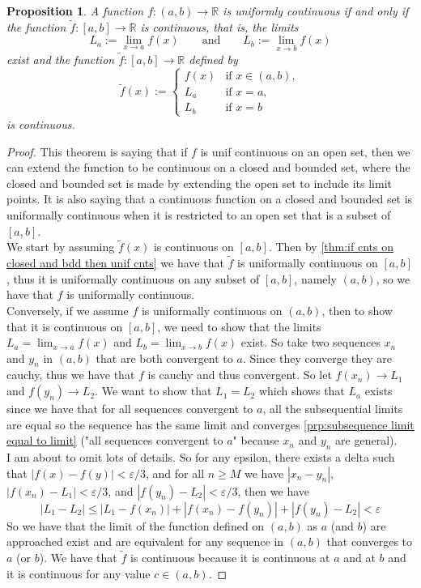 \documentclass{article}
\newtheorem{proposition}{Proposition}[section]
\theoremstyle{definition}
\theoremstyle{remark}
\begin{document}
\vspace{.5cm}


\begin{proposition}
A function $f : (a, b) \to \mathbb{R}$ is uniformly continuous if and only if the function $\tilde{f}: [a,b] \to \mathbb{R}$ is continuous, that is, the limits
\[
L_a := \lim_{x \to a} f(x) \qquad \text{and} \qquad L_b := \lim_{x \to b} f(x)
\]
exist and the function $\tilde{f} : [a, b] \to \mathbb{R}$ defined by
\[
\tilde{f}(x) := 
\begin{cases}
f(x) & \text{if } x \in (a, b), \\
L_a & \text{if } x = a, \\
L_b & \text{if } x = b
\end{cases}
\]
is continuous.
\end{proposition}

\begin{proof}
This theorem is saying that if $f$ is unif continuous on an open set, then we can extend 
the function to be continuous on a closed and bounded set, where the closed and bounded set is made by extending the open set to include its limit points. 
It is also saying that a continuous function on a closed and bounded set is
uniformally continuous when it is restricted to an open set that is a subset of $[a,b]$.\\
We start by assuming $\tilde{f}(x)$ is continuous on $[a,b]$. Then by \ref{thm:if cnts on closed and bdd then unif cnts} we have that $\tilde{f}$ 
is uniformally continuous on $[a,b]$, thus it is uniformally continuous on any subset of $[a,b]$, namely 
$(a,b)$, so we have that $f$ is uniformally continuous. \\
Conversely, if we assume $f$ is uniformally continuous on $(a,b)$, then to show that 
it is continuous on $[a,b]$, we need to show that the limits $L_a = \lim_{x \to a}{f(x)}$ and $L_b = \lim_{x \to b}{f(x)}$ exist. 
So take two sequences $x_n$ and $y_n$ in $(a,b)$ that are both convergent to $a$. Since they converge they are cauchy, 
thus we have that $f$ is cauchy and thus convergent. So let $f(x_n) \to L_1$ and $f(y_n) \to L_2$. We want to show that
$L_1 = L_2$ which shows that $L_a$ exists since we have that for all sequences convergent to $a$, all the subsequential limits are equal so the sequence has the same limit and converges \ref{prp:subsequence limit equal to limit} ("all sequences convergent to $a$" because $x_n$ and $y_n$ are general).\\
I am about to omit lots of details. So for any epsilon, there exists a delta such that $|f(x)-f(y)| < \varepsilon/3$, and for all $n \geq M$ we have 
$|x_n - y_n|$, $|f(x_n) - L_1| < \varepsilon/3$, and $|f(y_n) - L_2| < \varepsilon/3$, then we have 
\[
|L_1 - L_2| \leq |L_1 - f(x_n)| + |f(x_n) - f(y_n)| + |f(y_n) - L_2| < \varepsilon
\]
So we have that the limit of the function defined on $(a,b)$ as $a$ (and $b$) are approached 
exist and are equivalent for any sequence in $(a,b)$ that converges to $a$ (or $b$). We have that 
$\tilde{f}$ is continuous because it is continuous at $a$ and at $b$ and it is continuous for any value $c \in (a,b)$. 
\end{proof}
\end{document}
